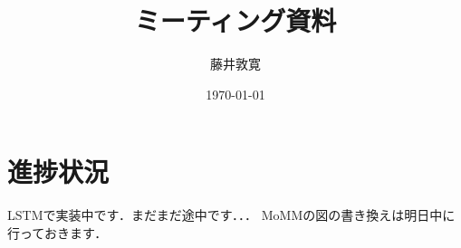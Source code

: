 \documentclass[a4j,10pt]{jarticle}
\title{ミーティング資料}
\author{藤井敦寛}
\date{\today}
\begin{document}
\maketitle

\section{進捗状況}
LSTMで実装中です．まだまだ途中です．．．
MoMMの図の書き換えは明日中に行っておきます．



\end{document}
